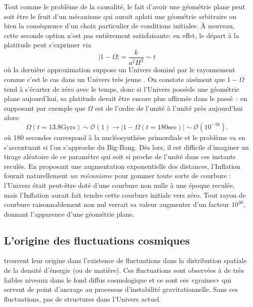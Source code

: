 Tout comme le problème de la causalité, le fait d'avoir une géométrie plane peut soit être le fruit d'un mécanisme qui aurait aplati une géométrie arbitraire ou bien la conséquence d'un choix particulier de conditions initiales. À nouveau, cette seconde option n'est pas entièrement satisfaisante: en effet, le départ à la platitude peut s'exprimer via 
\begin{equation}
|1-\Omega|=\frac{k}{a^2 H^2}\sim t
\end{equation}
où la dernière approximation suppose un Univers dominé par le rayonnement comme c'est le cas dans un Univers très jeune . On constate aisément que $1-\Omega$ tend à s'écarter de zéro avec le temps, donc si l'Univers possède une géométrie plane aujourd'hui, sa platitude devait être encore plus affirmée dans le passé~: en supposant par exemple que $\Omega$ est de l'ordre de l'unité à l'unité près aujourd'hui alors:
\begin{equation}
\Omega (t=13.8 \mathrm{Gyrs}) \sim \mathcal{O} (1) \rightarrow |1-\Omega (t=180 \mathrm{sec})| \sim \mathcal{O} (10^{-16}).
\end{equation}
où 180 secondes correspond à la nucléosynthèse primordiale et le problème va en s'accentuant si l'on s'approche du Big-Bang.
Dès lors, il est difficile d'imaginer un tirage aléatoire de ce paramètre qui soit si proche de l'unité dans ces instants reculés. En proposant une augmentation exponentielle des distances, l'Inflation fournit naturellement \textit{un mécanisme} pour gommer toute sorte de courbure : l'Univers était peut-être doté d'une courbure non nulle à une époque reculée, mais l'Inflation aurait fait tendre cette courbure initiale vers zéro. Tout rayon de courbure raisonnablement non nul verrait sa valeur augmenter d'un facteur $10^{30}$, donnant l'apparence d'une géométrie plane.

\subsection{L'origine des fluctuations cosmiques}
 trouvent leur origine dans l'existence de fluctuations dans la distribution spatiale de la densité d'énergie (ou de matière). Ces fluctuations sont observées à de très faibles niveaux dans le fond diffus cosmologique et ce sont ces «graines» qui servent de point d'ancrage au processus d'instabilité gravitationnelle. Sans ces fluctuations, pas de structures dans l'Univers actuel. 

